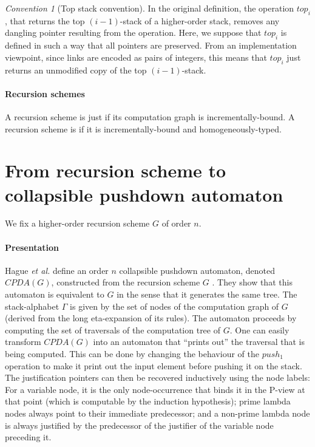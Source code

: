 \documentclass[a4paper,draft]{article}
\theoremstyle{remark}
\newtheorem{convention}{Convention}[section]
\theoremstyle{definition}
\begin{document}
\begin{convention}[Top stack convention]
\label{conv:top_preserve_links}
In the original definition, the operation $top_i$, that returns the top $(i-1)$-stack of a higher-order stack,
 removes any dangling pointer resulting from the operation. Here, we suppose that $top_i$ is defined in such a way that all pointers are preserved. From an implementation viewpoint, since links are encoded as pairs of integers, this means that $top_i$ just returns an unmodified copy of the top $(i-1)$-stack.
\end{convention}

\paragraph{Recursion schemes} \hfill


A recursion scheme is  just if its computation graph is incrementally-bound.
A recursion scheme is  if it is incrementally-bound and homogeneously-typed.


\section{From recursion scheme to collapsible pushdown automaton}

We fix a higher-order recursion scheme $G$ of order $n$.

\paragraph{Presentation}
Hague \emph{et al.} define an order $n$ collapsible pushdown automaton, denoted $CPDA(G)$, constructed from the recursion scheme $G$ \cite[Definition 5.2]{hague-collaps-full}. They show that this automaton is equivalent to $G$ in the sense that it generates the same tree.
The stack-alphabet $\Gamma$ is given by the set of nodes of the computation graph of $G$ (derived from the long eta-expansion of its rules). The automaton proceeds by computing the set of traversals of the computation tree of $G$. One can easily transform $CPDA(G)$ into an automaton that ``prints out'' the traversal that is being computed. This can be done by changing the behaviour of the $push_1$ operation to make it print out the input element before pushing it on the stack. The justification pointers can then be recovered inductively using the node labels: For a variable node, it is the only node-occurrence that binds it in the P-view at that point (which is computable by the induction hypothesis); prime lambda nodes always point to their immediate predecessor; and a non-prime lambda node is always justified by the predecessor of the justifier of the variable node preceding it.
\end{document}
